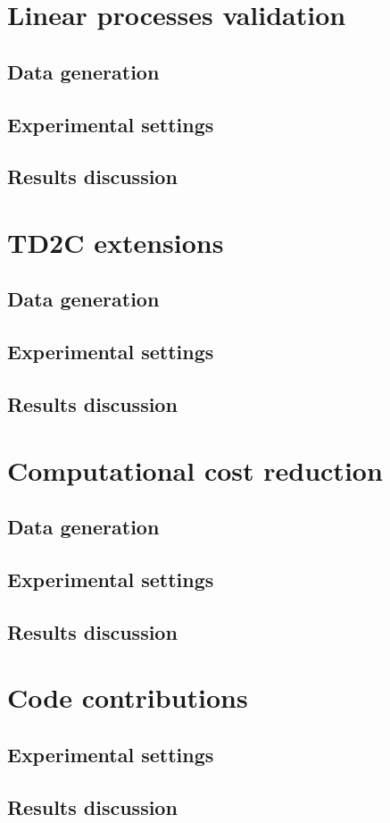 \section{Linear processes validation}\label{contr2}
\subsection{Data generation}
\subsection{Experimental settings}
\subsection{Results discussion}

\section{TD2C extensions}\label{contr3}
\subsection{Data generation}
\subsection{Experimental settings}
\subsection{Results discussion}

\section{Computational cost reduction}\label{contr4}
\subsection{Data generation}
\subsection{Experimental settings}
\subsection{Results discussion}

\section{Code contributions}\label{contr5}
\subsection{Experimental settings}
\subsection{Results discussion}
